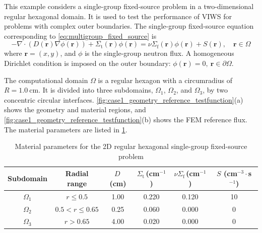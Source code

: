 \documentclass[final,3p,times,sort&compress]{elsarticle}
\begin{document}
This example considers a single-group fixed-source problem in a two-dimensional regular hexagonal domain. It is used to test the performance of VIWS for problems with complex outer boundaries. The single-group fixed-source equation corresponding to \cref{eq:multigroup_fixed_source} is
\begin{equation}
-\nabla\cdot \left( D(\boldsymbol r)\nabla\phi(\boldsymbol r) \right) + \Sigma_{\mathrm{t}}(\boldsymbol r)\phi(\boldsymbol r) = \nu\Sigma_{\mathrm{f}}(\boldsymbol r)\phi(\boldsymbol r) + S(\boldsymbol r), \quad \boldsymbol r\in\Omega
\label{eq:single_group_diffusion}
\end{equation}
where $\boldsymbol r=(x,y)$, and $\phi$ is the single-group neutron flux. A homogeneous Dirichlet condition is imposed on the outer boundary:
$\phi(\boldsymbol r)=0,\ \boldsymbol r\in\partial\Omega.$

The computational domain $\Omega$ is a regular hexagon with a circumradius of $R=1.0\ \mathrm{cm}$. It is divided into three subdomains, $\Omega_1$, $\Omega_2$, and $\Omega_3$, by two concentric circular interfaces. \cref{fig:case1_geometry_reference_testfunction}(a) shows the geometry and material regions, and \cref{fig:case1_geometry_reference_testfunction}(b) shows the FEM reference flux. The material parameters are listed in \cref{tab:case1_material_parameters}.


\begin{table}[H]
    \centering
    \caption{Material parameters for the 2D regular hexagonal single-group fixed-source problem}
    \label{tab:case1_material_parameters}
    \small
    \begin{tabularx}{0.95\textwidth}{@{\extracolsep{\fill}}cccccc}
        \toprule
        Subdomain         & Radial range               & $D$\,(cm) & $\Sigma_{\mathrm{t}}$\,(cm$^{-1}$) & $\nu\Sigma_{\mathrm{f}}$\,(cm$^{-1}$) & $S$ (cm$^{-3}\cdot$s$^{-1}$) \\
        \midrule
        $\Omega_1$ & $r \le 0.5$        & 1.00      & 0.220                              & 0.120                                 & 10                       \\
        $\Omega_2$ & $0.5 < r \le 0.65$ & 0.25      & 0.060                              & 0.000                                 & 0                        \\
        $\Omega_3$ & $r > 0.65$         & 4.00      & 0.020                              & 0.000                                 & 0                        \\
        \bottomrule
    \end{tabularx}
\end{table}
\end{document}
